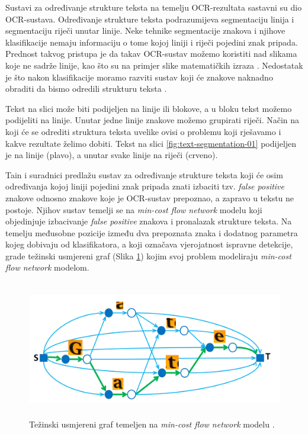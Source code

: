 \documentclass[times, utf8, zavrsni]{fer}
\begin{document}
Sustavi za određivanje strukture teksta na temelju OCR-rezultata sastavni su dio OCR-sustava. Određivanje strukture teksta
podrazumijeva segmentaciju linija i segmentaciju riječi unutar linije. Neke tehnike segmentacije
znakova i njihove klasifikacije nemaju informaciju o tome kojoj liniji i riječi pojedini znak pripada.
Prednost takvog pristupa je da takav OCR-sustav možemo koristiti nad slikama koje ne sadrže linije,
kao što su na primjer slike matematičkih izraza \citep{Jurin:2017:Master}. Nedostatak je što nakon klasifikacije
moramo razviti sustav koji će znakove naknadno obraditi da bismo odredili strukturu teksta \citep{Jurin:2017:Master}.

Tekst na slici može biti podijeljen na linije ili blokove, a u bloku
tekst možemo podijeliti na linije. Unutar jedne linije znakove možemo grupirati riječi. Način na
koji će se odrediti struktura teksta uvelike ovisi o problemu koji rješavamo i kakve rezultate
želimo dobiti. Tekst na slici \ref{fig:text-segmentation-01} podijeljen je na linije (plavo), a unutar
svake linije na riječi (crveno).

Tain i suradnici \citep{DBLP:journals/corr/TianPHLYT16} predlažu sustav za određivanje strukture teksta
koji će osim određivanja kojoj liniji pojedini znak pripada znati izbaciti tzv. \emph{false positive}
znakove odnosno znakove koje je OCR-sustav prepoznao, a zapravo u tekstu ne postoje. Njihov sustav temelji
se na \emph{min-cost flow network} modelu koji objedinjuje izbacivanje \emph{false positive} znakova i
pronalazak strukture teksta. Na temelju međusobne pozicije između dva prepoznata znaka i
dodatnog parametra kojeg dobivaju od klasifikatora, a koji označava vjerojatnost ispravne detekcije, grade težinski
usmjereni graf (Slika \ref{fig:text-flow}) kojim svoj problem modeliraju \emph{min-cost flow network} modelom.

\begin{figure}[htb]
    \centering
    \captionsetup{justification=centering,margin=2cm}
    \includegraphics[height=6cm]{images/text-flow.png}
    \caption{Težinski usmjereni graf temeljen na \emph{min-cost flow network} modelu \citep{DBLP:journals/corr/TianPHLYT16}.}
    \label{fig:text-flow}
\end{figure}
\end{document}
